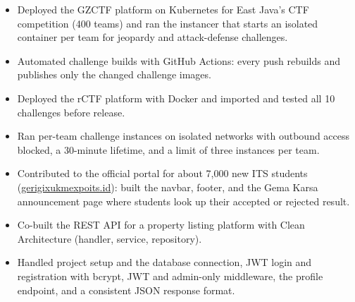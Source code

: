 \vspace{2pt}

\begin{itemize}
    \item Deployed the GZCTF platform on Kubernetes for East Java's CTF competition (400 teams) and ran the instancer that starts an isolated container per team for jeopardy and attack-defense challenges.
    \item Automated challenge builds with GitHub Actions: every push rebuilds and publishes only the changed challenge images.
\end{itemize}

\vspace{2pt}

\begin{itemize}
    \item Deployed the rCTF platform with Docker and imported and tested all 10 challenges before release.
    \item Ran per-team challenge instances on isolated networks with outbound access blocked, a 30-minute lifetime, and a limit of three instances per team.
\end{itemize}

\vspace{2pt}

\begin{itemize}
    \item Contributed to the official portal for about 7,000 new ITS students (\href{https://gerigixukmexpoits.id}{gerigixukmexpoits.id}): built the navbar, footer, and the Gema Karsa announcement page where students look up their accepted or rejected result.
\end{itemize}

\vspace{2pt}

\begin{itemize}
    \item Co-built the REST API for a property listing platform with Clean Architecture (handler, service, repository).
    \item Handled project setup and the database connection, JWT login and registration with bcrypt, JWT and admin-only middleware, the profile endpoint, and a consistent JSON response format.
\end{itemize}

